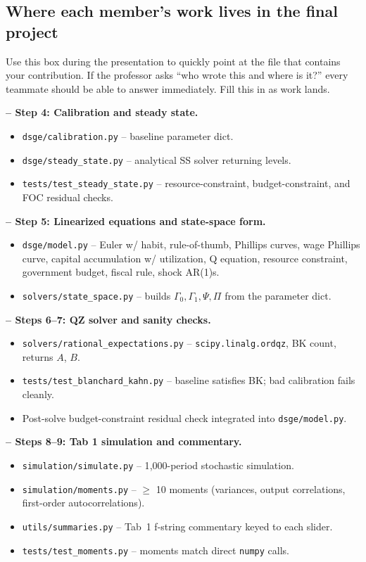 \documentclass[11pt]{article}
\newcommand{\nameblank}{\underline{\hspace{4.5cm}}}
\begin{document}
\subsection{Where each member's work lives in the final project}

Use this box during the presentation to quickly point at the file that contains your contribution. If the professor asks ``who wrote this and where is it?'' every teammate should be able to answer immediately. Fill this in as work lands.

\begin{intuitbox}
\textbf{\nameblank{} -- Step 4: Calibration and steady state.}
\begin{itemize}
    \item \texttt{dsge/calibration.py} -- baseline parameter dict.
    \item \texttt{dsge/steady\_state.py} -- analytical SS solver returning levels.
    \item \texttt{tests/test\_steady\_state.py} -- resource-constraint, budget-constraint, and FOC residual checks.
\end{itemize}

\medskip
\textbf{\nameblank{} -- Step 5: Linearized equations and state-space form.}
\begin{itemize}
    \item \texttt{dsge/model.py} -- Euler w/ habit, rule-of-thumb, Phillips curves, wage Phillips curve, capital accumulation w/ utilization, Q equation, resource constraint, government budget, fiscal rule, shock AR(1)s.
    \item \texttt{solvers/state\_space.py} -- builds $\Gamma_0, \Gamma_1, \Psi, \Pi$ from the parameter dict.
\end{itemize}

\medskip
\textbf{\nameblank{} -- Steps 6--7: QZ solver and sanity checks.}
\begin{itemize}
    \item \texttt{solvers/rational\_expectations.py} -- \texttt{scipy.linalg.ordqz}, BK count, returns $A$, $B$.
    \item \texttt{tests/test\_blanchard\_kahn.py} -- baseline satisfies BK; bad calibration fails cleanly.
    \item Post-solve budget-constraint residual check integrated into \texttt{dsge/model.py}.
\end{itemize}

\medskip
\textbf{\nameblank{} -- Steps 8--9: Tab 1 simulation and commentary.}
\begin{itemize}
    \item \texttt{simulation/simulate.py} -- 1{,}000-period stochastic simulation.
    \item \texttt{simulation/moments.py} -- $\geq$ 10 moments (variances, output correlations, first-order autocorrelations).
    \item \texttt{utils/summaries.py} -- Tab~1 f-string commentary keyed to each slider.
    \item \texttt{tests/test\_moments.py} -- moments match direct \texttt{numpy} calls.
\end{itemize}


\end{intuitbox}
\end{document}
